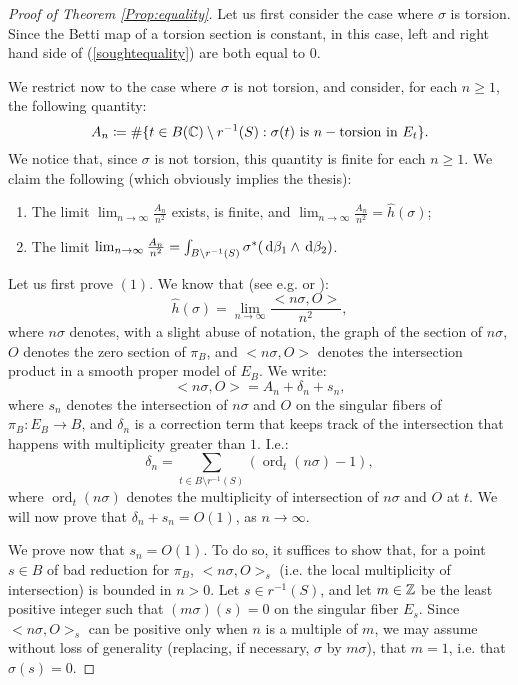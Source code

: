 \documentclass[a4paper,12pt]{article}
\theoremstyle{remark}
\DeclareMathOperator{\ord}{ord}
\begin{document}
\begin{proof}[Proof of Theorem \ref{Prop:equality}]
	Let us first consider the case where $\sigma$ is torsion. Since the Betti map of a torsion section is constant, in this case, left and right hand side of (\ref{soughtequality}) are both equal to $0$. 
	
	We restrict now to the case where $\sigma$ is not torsion, and consider, for each $n \geq 1$, the following quantity:
	\begin{equation}\label{targetorsion}
		A_n \coloneqq \# \{t \in B(\mathbb C)\setminus r^{-1}(S): \sigma(t) \text{ is }n-\text{torsion in } E_t\}.
	\end{equation}
	We notice that, since $\sigma$ is not torsion, this quantity is finite for each $n \geq 1$.
	We claim the following (which obviously implies the thesis):
	\begin{enumerate}
		\item The limit $\lim_{n \to \infty}\frac{A_n}{n^2}$ exists, is finite, and $\lim_{n \to \infty}\frac{A_n}{n^2}=\hat{h}(\sigma)$;
		\item The limit $\lim_{n \to \infty}\frac{A_n}{n^2}=\int_{B \setminus r^{-1}(S)} \sigma^*(\,\mathrm d \beta_1 \wedge \,\mathrm d \beta_2)$.
	\end{enumerate}
	Let us first prove $(1)$. We know that (see e.g. \cite[Section III.9]{silverman1994advanced} or \cite[Sections 2,3]{SerreMW}):
	\[
	\hat{h}(\sigma) =\lim_{n \to \infty} \frac{<n \sigma, O>}{n^2},
	\] 
	where $n\sigma$ denotes, with a slight abuse of notation, the graph of the section of $n \sigma$, $O$ denotes the zero section of $\pi_B$, and $<n \sigma, O>$ denotes the intersection product in a smooth proper model of $E_B$. We write:
	\[
	<n \sigma, O>=A_n+\delta_n+s_n,
	\]
	where $s_n$ denotes the intersection of $n \sigma$ and $O$ on the singular fibers of $\pi_B:E_B \rightarrow B$, and $\delta_n$ is a correction term that keeps track of the intersection that happens with multiplicity greater than $1$. I.e.:
	\[
	\delta_n=\sum_{t \in B\setminus r^{-1}(S)} (\ord_t(n\sigma)-1),
	\]
	where $\ord_t(n\sigma)$ denotes the multiplicity of intersection of $n\sigma$ and $O$ at $t$. 
	We will now prove that $\delta_n+s_n=O(1)$, as $n \to \infty$. 
	
	We prove now that $s_n=O(1)$. To do so, it suffices to show that, for a point $s \in B$ of bad reduction for $\pi_B$, $<n\sigma,O>_s$ (i.e. the local multiplicity of intersection) is bounded in $n>0$. Let $s \in r^{-1}(S)$, and let $m \in \mathbb Z$ be the least positive integer such that $(m\sigma)(s)=0$ on the singular fiber $E_s$. Since $<n \sigma, O>_s$ can be positive only when $n$ is a multiple of $m$, we may assume without loss of generality (replacing, if necessary, $\sigma$ by $m\sigma$), that $m=1$, i.e. that $\sigma(s)=0$. 
	

\end{proof}
\end{document}
